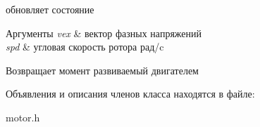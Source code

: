 обновляет состояние 


\begin{DoxyParams}{Аргументы}
{\em vex} & вектор фазных напряжений \\
\hline
{\em spd} & угловая скорость ротора рад/c \\
\hline
\end{DoxyParams}
\begin{DoxyReturn}{Возвращает}
момент развиваемый двигателем 
\end{DoxyReturn}


Объявления и описания членов класса находятся в файле\+:\begin{DoxyCompactItemize}
\item 
motor.\+h\end{DoxyCompactItemize}
